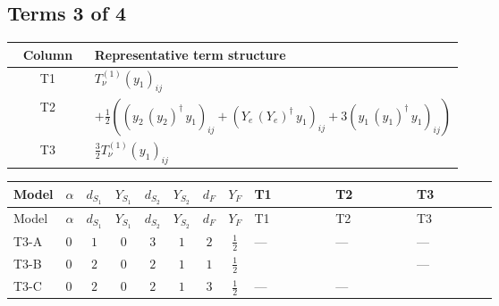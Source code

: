 \documentclass[8pt]{article}
\begin{document}
\begin{landscape}
\subsection*{Terms 3 of 4}
\begin{center}
\begin{tabular}{@{}c >{\raggedright\arraybackslash}p{0.82\linewidth}@{}}
\toprule
Column & Representative term structure \\
\midrule
T1 & \(\displaystyle T_{\nu}^{(1)} \left({y_1}\right)_{ij}\) \\
\midrule
T2 & \(\displaystyle +\frac{1}{2} (\left({y_2}\,\left({y_2}\right)^{\dagger}\,{y_1}\right)_{ij}+\left({Y_e}\,\left({Y_e}\right)^{\dagger}\,{y_1}\right)_{ij}+3 \left({y_1}\,\left({y_1}\right)^{\dagger}\,{y_1}\right)_{ij})\) \\
\midrule
T3 & \(\displaystyle \frac{3}{2} T_{\nu}^{(1)} \left({y_1}\right)_{ij}\) \\
\midrule
\bottomrule
\end{tabular}
\end{center}
\smallskip
\tiny
\begin{longtable}{@{}llcccccc >{\raggedright\arraybackslash}p{0.21\linewidth} >{\raggedright\arraybackslash}p{0.21\linewidth} >{\raggedright\arraybackslash}p{0.21\linewidth}@{}}
\toprule
Model & $\alpha$ & $d_{S_1}$ & $Y_{S_1}$ & $d_{S_2}$ & $Y_{S_2}$ & $d_F$ & $Y_F$ & T1 & T2 & T3 \\
\midrule
\endfirsthead
\toprule
Model & $\alpha$ & $d_{S_1}$ & $Y_{S_1}$ & $d_{S_2}$ & $Y_{S_2}$ & $d_F$ & $Y_F$ & T1 & T2 & T3 \\
\midrule
\endhead
T3-A & $0$ & $1$ & $0$ & $3$ & $1$ & $2$ & $\frac{1}{2}$ & --- & --- & --- \\
\midrule
T3-B & $0$ & $2$ & $0$ & $2$ & $1$ & $1$ & $\frac{1}{2}$ & \scriptsize\adjustbox{max width=\linewidth}{$\begin{gathered} T_{\nu}^{(1)} \left({y_1}\right)_{ij}\end{gathered}$} & \scriptsize\adjustbox{max width=\linewidth}{$\begin{gathered} +\frac{1}{2} (\left({y_2}\,\left({y_2}\right)^{\dagger}\,{y_1}\right)_{ij}+\left({Y_e}\,\left({Y_e}\right)^{\dagger}\,{y_1}\right)_{ij}+3 \left({y_1}\,\left({y_1}\right)^{\dagger}\,{y_1}\right)_{ij})\end{gathered}$} & --- \\
\midrule
T3-C & $0$ & $2$ & $0$ & $2$ & $1$ & $3$ & $\frac{1}{2}$ & --- & --- & \scriptsize\adjustbox{max width=\linewidth}{$\begin{gathered} \frac{3}{2} T_{\nu}^{(1)} \left({y_1}\right)_{ij}\end{gathered}$} \\

\end{longtable}
\end{landscape}
\end{document}

